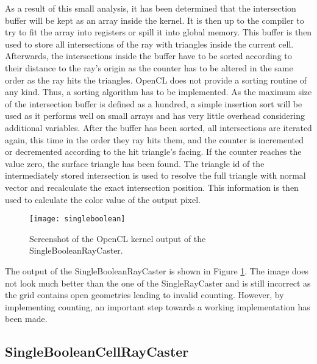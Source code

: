 As a result of this small analysis, it has been determined that the intersection buffer will be kept as an array inside the kernel. It is then up to the compiler to try to fit the array into registers or spill it into global memory. This buffer is then used to store all intersections of the ray with triangles inside the current cell. Afterwards, the intersections inside the buffer have to be sorted according to their distance to the ray's origin as the counter has to be altered in the same order as the ray hits the triangles. OpenCL does not provide a sorting routine of any kind. Thus, a sorting algorithm has to be implemented. As the maximum size of the intersection buffer is defined as a hundred, a simple insertion sort will be used as it performs well on small arrays and has very little overhead considering additional variables. After the buffer has been sorted, all intersections are iterated again, this time in the order they ray hits them, and the counter is incremented or decremented according to the hit triangle's facing. If the counter reaches the value zero, the surface triangle has been found. The triangle id of the intermediately stored intersection is used to resolve the full triangle with normal vector and recalculate the exact intersection position. This information is then used to calculate the color value of the output pixel.

\begin{figure}
\centering
\texttt{[image: singleboolean]}
\caption{Screenshot of the OpenCL kernel output of the SingleBooleanRayCaster.}
\label{fig:singleboolean}
\end{figure}

The output of the SingleBooleanRayCaster is shown in Figure \ref{fig:singleboolean}. The image does not look much better than the one of the SingleRayCaster and is still incorrect as the grid contains open geometries leading to invalid counting. However, by implementing counting, an important step towards a working implementation has been made.

\subsection{SingleBooleanCellRayCaster}
\label{sec:single_boolean_cell}

